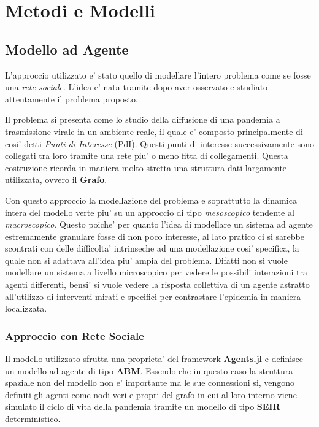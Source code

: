 \section{Metodi e Modelli}

\subsection{Modello ad Agente}
L'approccio utilizzato e' stato quello di modellare l'intero problema come 
se fosse una \emph{rete sociale}. L'idea e' nata tramite dopo aver osservato e 
studiato attentamente il problema proposto. 

Il problema si presenta come lo studio della diffusione di una pandemia a trasmissione
virale in un ambiente reale, il quale e' composto principalmente di cosi' detti 
\emph{Punti di Interesse} (PdI). Questi punti di interesse successivamente sono 
collegati tra loro tramite una rete piu' o meno fitta di collegamenti. Questa costruzione
ricorda in maniera molto stretta una struttura dati largamente utilizzata, ovvero il \textbf{Grafo}.

Con questo approccio la modellazione del problema e soprattutto la dinamica intera del 
modello verte piu' su un approccio di tipo \emph{mesoscopico} tendente al \emph{macroscopico}.
Questo poiche' per quanto l'idea di modellare un sistema ad agente estremamente granulare fosse 
di non poco interesse, al lato pratico ci si sarebbe scontrati con delle difficolta' 
intrinseche ad una modellazione cosi' specifica, la quale non si adattava all'idea piu' 
ampia del problema. Difatti non si vuole modellare un sistema a livello microscopico per vedere
le possibili interazioni tra agenti differenti, bensi' si vuole vedere la risposta collettiva di un
agente astratto all'utilizzo di interventi mirati e specifici per contrastare l'epidemia in 
maniera localizzata.

\subsubsection*{Approccio con Rete Sociale}
Il modello utilizzato sfrutta una proprieta' del framework \textbf{Agents.jl} e definisce un 
modello ad agente di tipo \textbf{ABM}. Essendo che in questo caso la struttura spaziale non 
del modello non e' importante ma le sue connessioni si, vengono definiti gli agenti come nodi
veri e propri del grafo in cui al loro interno viene simulato il ciclo di vita della pandemia 
tramite un modello di tipo \textbf{SEIR} deterministico.

